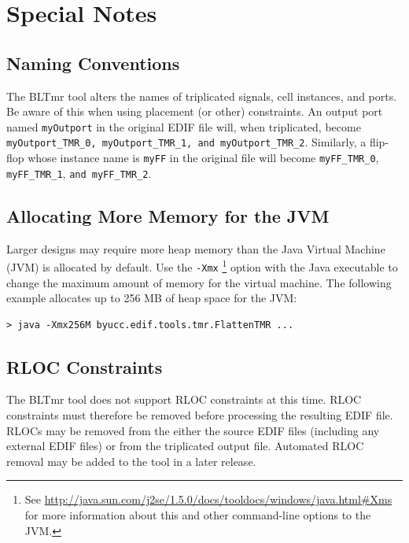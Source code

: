 \documentclass[english]{article}
\begin{document}

\section{Special Notes}

\subsection{Naming Conventions}
\label{naming conventions}
The BLTmr tool alters the names of triplicated signals, cell instances, and 
ports. Be aware of this when using placement (or other) constraints. An output 
port named \texttt{myOutport} in the original EDIF file will, when triplicated, 
become \texttt{myOutport\_TMR\_0, myOutport\_TMR\_1, and myOutport\_TMR\_2}. 
Similarly, a flip-flop whose instance name is \texttt{myFF} in the original file
will become \texttt{myFF\_TMR\_0}, \texttt{myFF\_TMR\_1}, 
\texttt{and myFF\_TMR\_2}.

\subsection{Allocating More Memory for the JVM}
Larger designs may require more heap memory than the Java Virtual Machine (JVM) 
is allocated by default. Use the \texttt{-Xmx}
\footnote{See 
\url{http://java.sun.com/j2se/1.5.0/docs/tooldocs/windows/java.html\#Xms} 
for more information about this and other command-line options to the JVM.} 
option with the Java executable to change the maximum amount of memory for 
the virtual machine. The following example allocates up to 256 MB of 
heap space for the JVM:

\begin{verbatim}
> java -Xmx256M byucc.edif.tools.tmr.FlattenTMR ...
\end{verbatim}

\subsection{RLOC Constraints}
The BLTmr tool does not support RLOC constraints at this time. RLOC constraints 
must therefore be removed before processing the resulting EDIF file. RLOCs may 
be removed from the either the source EDIF files (including any external EDIF 
files) or from the triplicated output file. Automated RLOC removal may be added 
to the tool in a later release.
\end{document}
